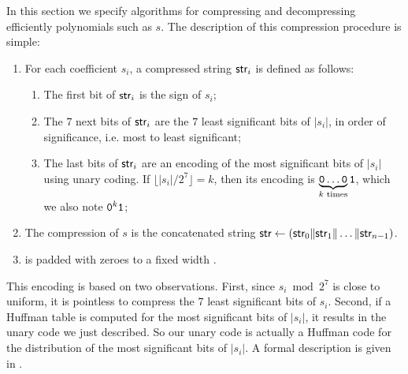 In this section we specify algorithms for compressing and decompressing efficiently polynomials such as $s$. The description of this compression procedure is simple:
\begin{enumerate}
 \item
 For each coefficient $s_i$, a compressed string $\textsf{str}_i$ is defined as follows:
 \begin{enumerate}
  \item The first bit of $\textsf{str}_i$ is the sign of $s_i$;
  \item The $7$ next bits of $\textsf{str}_i$ are the $7$ least significant bits of $|s_i|$, in order of significance, i.e. most to least significant;
  \item The last bits of $\textsf{str}_i$  are an encoding of the most significant bits of $|s_i|$ using unary coding. If $\lfloor|s_i|/2^7\rfloor = k$, then its encoding is $\underbrace{\tt{0\dots 0}}_{k \text{ times}} \tt 1$, which we also note ${{\tt 0}^k \tt 1}$;
 \end{enumerate}
  \item
 The compression of $s$ is the concatenated string $\textsf{str} \gets (\textsf{str}_0\|\textsf{str}_1\|\dots\|\textsf{str}_{n-1})$.

 \item
 \str is padded with zeroes to a fixed width \slen.
\end{enumerate}
This encoding is based on two observations. First, since $s_i \bmod 2^7$ is close to uniform, it is pointless to compress the $7$ least significant bits of $s_i$. Second, if a Huffman table is computed for the most significant bits of $|s_i|$, it results in the unary code we just described. So our unary code is actually a Huffman code for the distribution of the most significant bits of $|s_i|$. A formal description is given in \longcompress.

